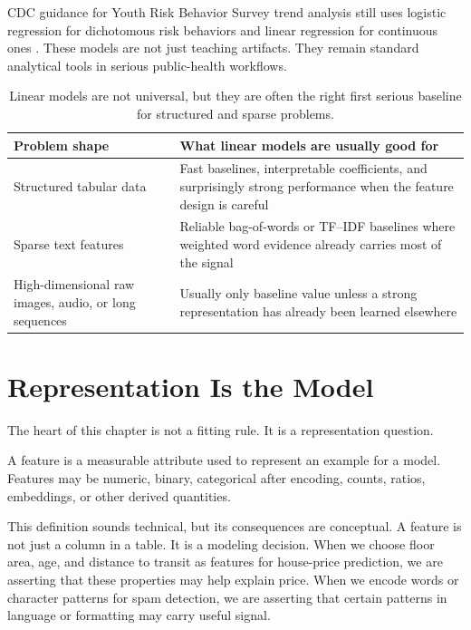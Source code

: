 \begin{evidencebox}
CDC guidance for Youth Risk Behavior Survey trend analysis still uses logistic regression for dichotomous risk behaviors and linear regression for continuous ones \citep{cdc_yrbs_trends}. These models are not just teaching artifacts. They remain standard analytical tools in serious public-health workflows.
\end{evidencebox}

\begin{table}[t]
\centering
\small
\setlength{\tabcolsep}{4pt}
\begin{tabular}{p{3.41cm}p{6.82cm}}
\toprule
Problem shape & What linear models are usually good for \\
\midrule
Structured tabular data & Fast baselines, interpretable coefficients, and surprisingly strong performance when the feature design is careful \\
Sparse text features & Reliable bag-of-words or TF--IDF baselines where weighted word evidence already carries most of the signal \\
High-dimensional raw images, audio, or long sequences & Usually only baseline value unless a strong representation has already been learned elsewhere \\
\bottomrule
\end{tabular}
\caption{Linear models are not universal, but they are often the right first serious baseline for structured and sparse problems.}
\label{tab:linear-model-regimes}
\end{table}

\section{Representation Is the Model}

The heart of this chapter is not a fitting rule. It is a representation question.

\begin{definition}[Feature]
A feature is a measurable attribute used to represent an example for a model. Features may be numeric, binary, categorical after encoding, counts, ratios, embeddings, or other derived quantities.
\end{definition}

This definition sounds technical, but its consequences are conceptual. A feature is not just a column in a table. It is a modeling decision. When we choose floor area, age, and distance to transit as features for house-price prediction, we are asserting that these properties may help explain price. When we encode words or character patterns for spam detection, we are asserting that certain patterns in language or formatting may carry useful signal.

